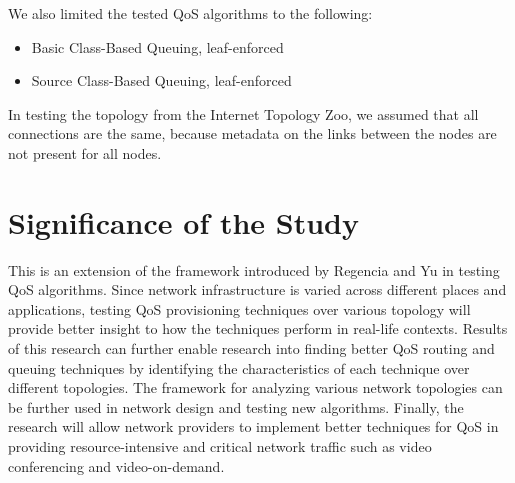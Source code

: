 We also limited the tested QoS algorithms to the following:
\begin{itemize}
    \item Basic Class-Based Queuing, leaf-enforced
    \item Source Class-Based Queuing, leaf-enforced
\end{itemize}

In testing the topology from the Internet Topology Zoo, we assumed that all connections are the same, because metadata on the links between the nodes are not present for all nodes.

\section{Significance of the Study}

This is an extension of the framework introduced by Regencia and Yu in testing QoS algorithms. Since network infrastructure is varied across different places and applications, testing QoS provisioning techniques over various topology will provide better insight to how the techniques perform in real-life contexts. Results of this research can further enable research into finding better QoS routing and queuing techniques by identifying the characteristics of each technique over different topologies. The framework for analyzing various network topologies can be further used in network design and testing new algorithms. Finally, the research will allow network providers to implement better techniques for QoS in providing resource-intensive and critical network traffic such as video conferencing and video-on-demand.

